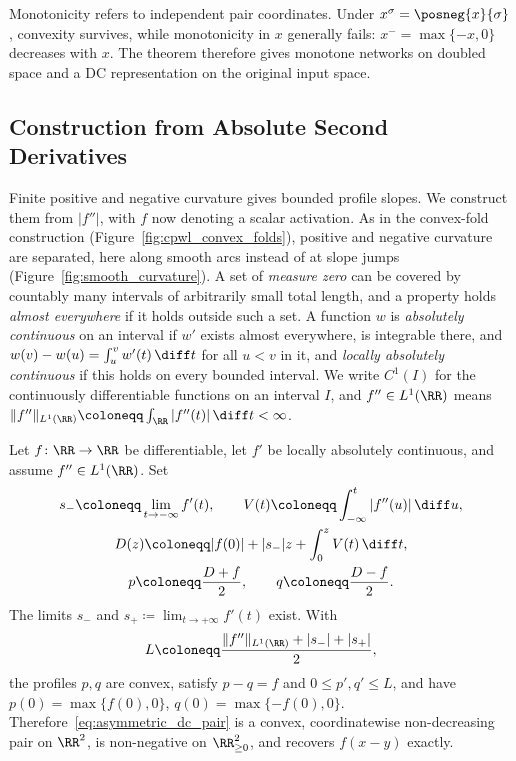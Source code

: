 Monotonicity refers to independent pair coordinates. Under $x^\sigma=\posneg{x}{\sigma}$, convexity survives, while monotonicity in $x$ generally fails: $x^- =\max\{-x,0\}$ decreases with $x$. The theorem therefore gives monotone networks on doubled space and a DC representation on the original input space.

\subsection{Construction from Absolute Second Derivatives}\label{sec:dc_splitting_smooth}

Finite positive and negative curvature gives bounded profile slopes. We construct them from $|f''|$, with $f$ now denoting a scalar activation. As in the convex-fold construction (Figure~\ref{fig:cpwl_convex_folds}), positive and negative curvature are separated, here along smooth arcs instead of at slope jumps (Figure~\ref{fig:smooth_curvature}). A set of \emph{measure zero} can be covered by countably many intervals of arbitrarily small total length, and a property holds \emph{almost everywhere} if it holds outside such a set. A function $w$ is \emph{absolutely continuous} on an interval if $w'$ exists almost everywhere, is integrable there, and $w(v)-w(u)=\int_u^v w'(t)\,\diff t$ for all $u<v$ in it, and \emph{locally absolutely continuous} if this holds on every bounded interval. We write $C^1(I)$ for the continuously differentiable functions on an interval $I$, and $f''\in L^1(\RR)$ means $\|f''\|_{L^1(\RR)}\coloneqq\int_{\RR}|f''(t)|\,\diff t<\infty$.

\begin{theoremenv}\label{thm:absolute_curvature_split}
Let $f\colon\RR\to\RR$ be differentiable, let $f'$ be locally absolutely continuous, and assume $f''\in L^1(\RR)$. Set
\begin{equation}
\begin{gathered}
    s_-\coloneqq\lim_{t\to-\infty}f'(t),\qquad
    V(t)\coloneqq\int_{-\infty}^{t}|f''(u)|\,\diff u,\\
    D(z)\coloneqq |f(0)|+|s_-|z+\int_0^z V(t)\,\diff t,\\
    p\coloneqq\frac{D+f}{2},\qquad q\coloneqq\frac{D-f}{2}.
\end{gathered}
    \label{eq:absolute_curvature_primitive}
\end{equation}
The limits $s_-$ and $s_+\coloneqq\lim_{t\to+\infty}f'(t)$ exist. With
\begin{equation}
    L\coloneqq\frac{\|f''\|_{L^1(\RR)}+|s_-|+|s_+|}{2},
    \label{eq:absolute_curvature_coefficient}
\end{equation}
the profiles $p,q$ are convex, satisfy $p-q=f$ and $0\le p',q'\le L$, and have $p(0)=\max\{f(0),0\}$, $q(0)=\max\{-f(0),0\}$. Therefore~\eqref{eq:asymmetric_dc_pair} is a convex, coordinatewise non-decreasing pair on $\RR^2$, is non-negative on $\RR^2_{\ge0}$, and recovers $f(x-y)$ exactly.
\end{theoremenv}

